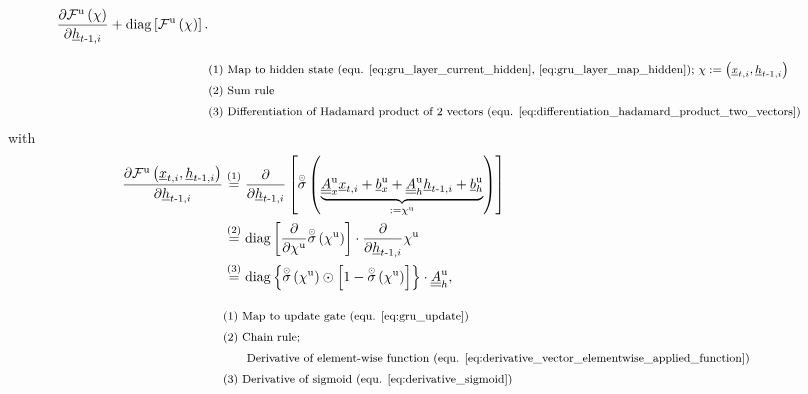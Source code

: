 \begin{align}
    \frac{\partial \mathcal{F}^\text{u}\left(\chi\right)}
        {\partial \underline h_{t\text{-}1, i}}
    +
    \mathrm{diag} \left[
        \mathcal{F}^\text{u}\left(\chi\right)
    \right].
    \\[2ex]
    &\textcolor{black}{\text{\footnotesize (1) 
            Map to hidden state (equ. \ref{eq:gru_layer_current_hidden}, \ref{eq:gru_layer_map_hidden}); 
            $\chi :=  \left(\underline x_{t, i}, \underline h_{t\text{-}1, i}\right)$}} \nonumber \\
    &\textcolor{black}{\text{\footnotesize (2) 
        Sum rule
    }} \nonumber \\
    &\textcolor{black}{\text{\footnotesize (3) 
        Differentiation of Hadamard product of 2 vectors 
        (equ. \ref{eq:differentiation_hadamard_product_two_vectors})
    }} \nonumber
\end{align}
with
\begin{align} \label{eq:gru_grad_update_2_previous_hidden} 
    \frac{\partial
    \mathcal{F}^\text{u} \left(\underline x_{t, i}, \underline h_{t\text{-}1, i}\right)
    }{\partial \underline h_{t\text{-}1, i}}
    &\overset{\textcolor{black}{(1)}}{=}
    \frac{\partial}{\partial \underline h_{t\text{-}1, i}}
    \left[
        \overset{\scriptscriptstyle \odot}{\sigma} \left(
            \underbrace{
            \underline{\underline A}^\text{u}_{x}
            \underline x_{t,i}
            +
            \underline b^\text{u}_{x}
            +
            \underline{\underline A}^\text{u}_{h}
            \underline h_{t\text -1,i}
            +
            \underline b^\text{u}_{h}}_{:=\chi^\text{u}}
        \right)
    \right]
    \nonumber \\ & \overset{\textcolor{black}{(2)}}{=}
    \mathrm{diag} \left[
        \frac{\partial}{\partial \chi^\text{u}}
        \overset{\scriptscriptstyle \odot}{\sigma} \left(\chi^\text{u}\right)
    \right]
    \cdot \frac{\partial}{\partial \underline h_{t\text{-}1, i}} \chi^\text{u}{}
    \nonumber \\ & \overset{\textcolor{black}{(3)}}{=}
    \mathrm{diag} \left\{
        \overset{\scriptscriptstyle \odot}{\sigma} \left(\chi^\text{u}\right)
        \odot
        \left[
            1 -  \overset{\scriptscriptstyle \odot}{\sigma} \left(\chi^\text{u}\right)
        \right]
    \right\}
    \cdot \underline{\underline A}^\text{u}_{h},
    \\[2ex]
        &\textcolor{black}{\text{\footnotesize (1) 
            Map to update gate (equ. \ref{eq:gru_update})}} \nonumber \\
        &\textcolor{black}{\text{\footnotesize (2) 
            Chain rule;
        }} \nonumber \\
        &\textcolor{black}{\text{\footnotesize \qquad
            Derivative of element-wise function
            (equ. \ref{eq:derivative_vector_elementwise_applied_function})
        }} \nonumber \\
        &\textcolor{black}{\text{\footnotesize (3) 
            Derivative of sigmoid (equ. \ref{eq:derivative_sigmoid})
        }} \nonumber
\end{align}
